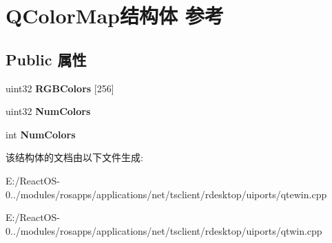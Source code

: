 \hypertarget{struct_q_color_map}{}\section{Q\+Color\+Map结构体 参考}
\label{struct_q_color_map}
\subsection*{Public 属性}
\begin{DoxyCompactItemize}
\item 
\mbox{\label{struct_q_color_map_a230944835770a247fe8056e48eaf0c13}} 
uint32 {\bfseries R\+G\+B\+Colors} \mbox{[}256\mbox{]}
\item 
\mbox{\label{struct_q_color_map_ac7de7e10d4ba52889563343b28bfe5f7}} 
uint32 {\bfseries Num\+Colors}
\item 
\mbox{\label{struct_q_color_map_acc9672f41aa284ec77de870874f3a6d4}} 
int {\bfseries Num\+Colors}
\end{DoxyCompactItemize}


该结构体的文档由以下文件生成\+:\begin{DoxyCompactItemize}
\item 
E\+:/\+React\+O\+S-\/0../modules/rosapps/applications/net/tsclient/rdesktop/uiports/qtewin.\+cpp\item 
E\+:/\+React\+O\+S-\/0../modules/rosapps/applications/net/tsclient/rdesktop/uiports/qtwin.\+cpp\end{DoxyCompactItemize}
